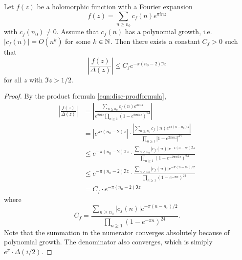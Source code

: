\begin{lemma}\label{lemma:mod-div-disc-bound}
Let $f(z)$ be a holomorphic function with a Fourier expansion
\begin{equation}
    f(z) = \sum_{n \ge n_0} c_f(n) e^{\pi i n z}
\end{equation}
with $c_f(n_0) \ne 0$.
Assume that $c_f(n)$ has a polynomial growth, i.e. $|c_f(n)| = O(n^k)$ for some $k \in \mathbb{N}$.
Then there exists a constant $C_f > 0$ such that
\begin{equation}
    \left|\frac{f(z)}{\Delta(z)}\right| \le C_f e^{-\pi (n_0 - 2) \Im z}
\end{equation}
for all $z$ with $\Im z > 1/2$.
\end{lemma}
\begin{proof}
By the product formula \eqref{eqn:disc-prodformula},
\begin{align}
    \left|\frac{f(z)}{\Delta(z)}\right| &= \left|\frac{\sum_{n \ge n_0} c_f(n) e^{\pi i n z}}{e^{2 \pi i z}\prod_{n \ge 1} (1 - e^{2\pi i n z})^{24}}\right| \\
    &= |e^{\pi i (n_0 - 2)z}| \cdot \frac{|\sum_{n \ge n_0} c_f(n) e^{\pi i (n - n_0) z}|}{\prod_{n \ge 1} |1 - e^{2\pi i n z}|^{24}} \\
    &\le e^{-\pi (n_0 - 2) \Im z} \cdot \frac{\sum_{n \ge n_0} |c_f(n)| e^{-\pi (n - n_0) \Im z}}{\prod_{n \ge 1} (1 - e^{- 2\pi n \Im z})^{24}} \\
    &\le e^{-\pi (n_0 - 2) \Im z} \cdot \frac{\sum_{n \ge n_0} |c_f(n)| e^{-\pi (n - n_0) / 2}}{\prod_{n \ge 1} (1 - e^{-\pi n})^{24}} \\
    &= C_f \cdot e^{-\pi (n_0 - 2) \Im z}
\end{align}
where
\begin{equation}
    C_f = \frac{\sum_{n \ge n_0} |c_f(n)| e^{-\pi (n - n_0) / 2}}{\prod_{n \ge 1} (1 - e^{-\pi n})^{24}}.
\end{equation}
Note that the summation in the numerator converges absolutely because of polynomial growth.
The denominator also converges, which is simiply $e^{\pi} \cdot \Delta(i/2)$.
\end{proof}

